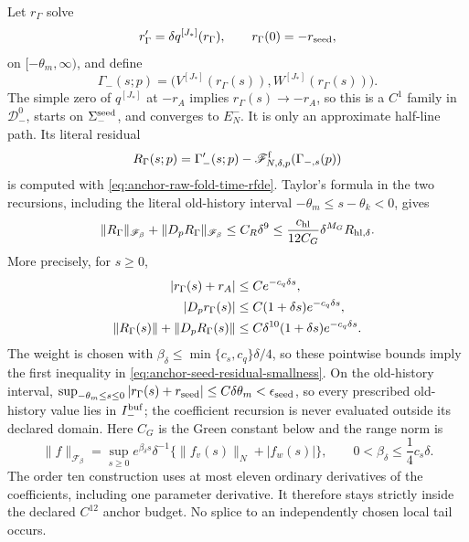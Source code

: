 \begin{lemma}
Let \(r_\Gamma\) solve
\begin{equation}
 r_\Gamma'=\delta q^{[J_*]}(r_\Gamma),\qquad
 r_\Gamma(0)=-r_{\rm seed},                          \label{eq:anchor-seed-slow-path}
\end{equation}
on \([ -\theta_m,\infty)\), and define
\begin{equation}
 \Gamma_-(s;p)
 =\bigl(V^{[J_*]}(r_\Gamma(s)),W^{[J_*]}(r_\Gamma(s))\bigr).
                                                               \label{eq:anchor-explicit-time-seed}
\end{equation}
The simple zero of \(q^{[J_*]}\) at \(-r_A\) implies
\(r_\Gamma(s)\to-r_A\), so this is a \(C^1\) family in
\(\mathscr D_-^0\), starts on \(\Sigma_-^{\rm seed}\), and converges to
\(E_N^-\).  It is only an approximate half-line path.  Its literal residual
\begin{equation}
 R_\Gamma(s;p)
 =\Gamma_-'(s;p)
  -\mathscr F^{\rm f}_{N,\delta,p}(\Gamma_{-,s}(p))   \label{eq:anchor-seed-residual}
\end{equation}
is computed with \cref{eq:anchor-raw-fold-time-rfde}.  Taylor's formula in
the two recursions, including the literal old-history interval
\(-\theta_m\le s-\theta_k<0\), gives
\begin{equation}
 \|R_\Gamma\|_{\mathscr F_\beta}
 +\|D_pR_\Gamma\|_{\mathscr F_\beta}
 \le C_R\delta^9
 \le\frac{c_{\rm hl}}{12C_G}
       \delta^{M_G}R_{\mathrm{hl},\delta}.             \label{eq:anchor-seed-residual-smallness}
\end{equation}
More precisely, for \(s\ge0\),
\begin{align}
 |r_\Gamma(s)+r_A|&\le Ce^{-c_q\delta s},\notag\\
 |D_pr_\Gamma(s)|&\le C(1+\delta s)e^{-c_q\delta s},               \label{eq:anchor-seed-tail-decay}\\
 \|R_\Gamma(s)\|+\|D_pR_\Gamma(s)\|
 &\le C\delta^{10}(1+\delta s)e^{-c_q\delta s}.       \label{eq:anchor-seed-tail-residual}
\end{align}
The weight is chosen with
\(\beta_\delta\le\min\{c_s,c_q\}\delta/4\), so these pointwise bounds
imply the first inequality in
\cref{eq:anchor-seed-residual-smallness}.  On the old-history interval,
\(\sup_{-\theta_m\le s\le0}|r_\Gamma(s)+r_{\rm seed}|
\le C\delta\theta_m<\epsilon_{\rm seed}\), so every prescribed old-history
value lies in \(I_-^{\rm buf}\); the coefficient recursion is never
evaluated outside its declared domain.
Here \(C_G\) is the Green constant below and the range norm is
\begin{equation}
 \|f\|_{\mathscr F_\beta}
 =\sup_{s\ge0}e^{\beta_\delta s}\delta^{-1}
       \{\|f_v(s)\|_N+|f_w(s)|\},
 \qquad 0<\beta_\delta\le\frac14c_s\delta.            \label{eq:anchor-half-line-range-norm}
\end{equation}
The order ten construction uses at most eleven ordinary derivatives of the
coefficients, including one parameter derivative.  It therefore stays
strictly inside the declared \(C^{12}\) anchor budget.  No splice to an
independently chosen local tail occurs.


\end{lemma}
